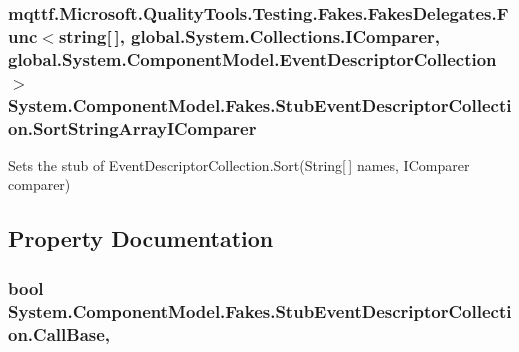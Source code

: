 \hypertarget{class_system_1_1_component_model_1_1_fakes_1_1_stub_event_descriptor_collection_a93ef102aeec7f94e484e5fecff19bcea}{
\subsubsection[{Sort\-String\-Array\-I\-Comparer}]{\setlength{\rightskip}{0pt plus 5cm}mqttf.\-Microsoft.\-Quality\-Tools.\-Testing.\-Fakes.\-Fakes\-Delegates.\-Func$<$string\mbox{[}$\,$\mbox{]}, global.\-System.\-Collections.\-I\-Comparer, global.\-System.\-Component\-Model.\-Event\-Descriptor\-Collection$>$ System.\-Component\-Model.\-Fakes.\-Stub\-Event\-Descriptor\-Collection.\-Sort\-String\-Array\-I\-Comparer}}\label{class_system_1_1_component_model_1_1_fakes_1_1_stub_event_descriptor_collection_a93ef102aeec7f94e484e5fecff19bcea}


Sets the stub of Event\-Descriptor\-Collection.\-Sort(\-String\mbox{[}$\,$\mbox{]} names, I\-Comparer comparer)



\subsection{Property Documentation}
\hypertarget{class_system_1_1_component_model_1_1_fakes_1_1_stub_event_descriptor_collection_a88696dde1705b333e000949a9e5b8185}{
\subsubsection[{Call\-Base}]{\setlength{\rightskip}{0pt plus 5cm}bool System.\-Component\-Model.\-Fakes.\-Stub\-Event\-Descriptor\-Collection.\-Call\-Base\hspace{0.3cm}{\ttfamily [get]}, {\ttfamily [set]}}}\label{class_system_1_1_component_model_1_1_fakes_1_1_stub_event_descriptor_collection_a88696dde1705b333e000949a9e5b8185}


